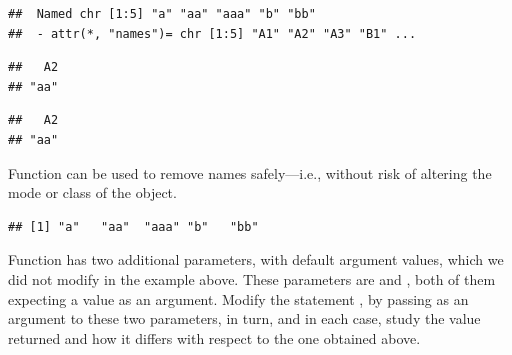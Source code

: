 \documentclass[krantz2]{krantz}\usepackage{knitr}
\begin{document}
\begin{knitrout}\footnotesize
{}\color{fgcolor}\begin{kframe}
\begin{alltt}
\end{alltt}
\begin{verbatim}
##  Named chr [1:5] "a" "aa" "aaa" "b" "bb"
##  - attr(*, "names")= chr [1:5] "A1" "A2" "A3" "B1" ...
\end{verbatim}
\begin{alltt}
\hlstd{c.vec[}\hlstd{]}
\end{alltt}
\begin{verbatim}
##   A2 
## "aa"
\end{verbatim}
\begin{alltt}
\hlstd{c.vec[}\hlstd{]}
\end{alltt}
\begin{verbatim}
##   A2 
## "aa"
\end{verbatim}
\end{kframe}
\end{knitrout}

Function  can be used to remove names safely---i.e., without risk of altering the mode or class of the object.

\begin{knitrout}\footnotesize
{}\color{fgcolor}\begin{kframe}
\begin{alltt}
\end{alltt}
\begin{verbatim}
## [1] "a"   "aa"  "aaa" "b"   "bb"
\end{verbatim}
\end{kframe}
\end{knitrout}

\begin{playground}
Function  has two additional parameters, with default argument values, which we did not modify in the example above. These parameters are  and , both of them expecting a  value as an argument. Modify the statement , by passing  as an argument to these two parameters, in turn, and in each case, study the value returned and how it differs with respect to the one obtained above.
\end{playground}
\end{document}
